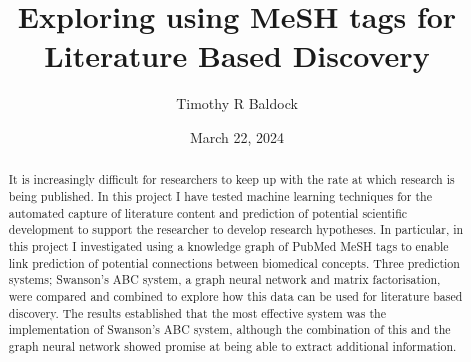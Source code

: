 \documentclass{l4proj}
\begin{document}
\title{Exploring using MeSH tags for Literature Based Discovery}
\author{Timothy R Baldock}
\date{March 22, 2024}

\maketitle

\begin{abstract}
    
    It is increasingly difficult for researchers to keep up with the rate at which research is being published. In this project I have tested  machine learning techniques for the automated capture of literature content and prediction of potential scientific development to support the researcher to develop research hypotheses. In particular, in this project I investigated using a knowledge graph of PubMed MeSH tags to enable link prediction of potential connections between biomedical concepts. Three prediction systems; Swanson's ABC system, a graph neural network and matrix factorisation, were compared and combined to explore how this data can be used for literature based discovery. The results established that the most effective  system was the implementation of Swanson's ABC system, although the combination of this and the graph neural network showed promise at being able to extract additional information. 

\end{abstract}



%
%
\def\consentname {Timothy R Baldock} %
\def\consentdate {22 March 2024} %
%
\educationalconsent


\tableofcontents
\end{document}
